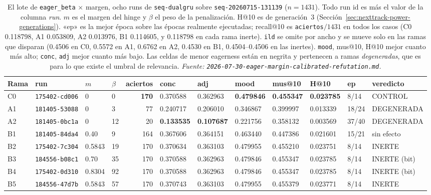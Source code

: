\documentclass[11pt]{article}
\newcommand{\runid}[1]{\texttt{\small\seqsplit{#1}}}
\newcommand{\dsid}[1]{\texttt{\small #1}}
\newcommand{\best}[1]{\textbf{#1}}
\begin{document}
\begin{table}[ht]
  \centering
  \caption{El lote de \texttt{eager\_beta} $\times$ margen, ocho runs de
  \texttt{seq-dualgru} sobre \dsid{seq-20260715-131139} ($n=\num{1431}$). Todo run
  id es \protect\runid{run-20260730-} más el valor de la columna \emph{run}. $m$ es
  el margen del hinge y $\beta$ el peso de la penalización. H@10 es de
  generación~3 (Sección~\ref{sec:nexttrack-power-generations}). «ep» es la mejor época sobre
  las épocas realmente ejecutadas; recall@10 es \texttt{aciertos}$/\num{1431}$ en
  todos los casos (C0 \num{0.118798}, A1 \num{0.053809}, A2 \num{0.013976}, B1
  \num{0.114605}, y \num{0.118798} en cada rama inerte). \texttt{ild} se omite por
  ancho y se mueve solo en las ramas que disparan (\num{0.4506} en C0,
  \num{0.5572} en A1, \num{0.6762} en A2, \num{0.4530} en B1,
  \numrange{0.4504}{0.4506} en las inertes). \texttt{mood}, mus@10, H@10 mejor
  cuanto más alto; \texttt{conc}, \texttt{adj} mejor cuanto más bajo. Las celdas de
  menor eagerness están en negrita y pertenecen a ramas \emph{degeneradas}, que es
  para lo que existe el umbral de relevancia.
  \emph{Fuente: \texttt{2026-07-30-eager-margin-calibrated-refutation.md}.}}
  \label{tab:nexttrack-eagermargin}
  {\scriptsize\setlength{\tabcolsep}{2.5pt}\begin{tabular}{llllrlllllll}
    \toprule
    Rama & run & $m$ & $\beta$ & aciertos & conc & adj & mood & mus@10 & H@10 & ep & veredicto \\
    \midrule
    C0 & \texttt{175402-cd006} & 0 & 0 & \best{170} & 0.370588 & 0.362963 & \best{0.479846} & \best{0.455347} & \best{0.023785} & 8/14 & CONTROL \\
    A1 & \texttt{181405-53088} & 0 & 3 & 77 & 0.240717 & 0.206010 & 0.346867 & 0.399997 & 0.013339 & 18/24 & DEGENERADA \\
    A2 & \texttt{181405-0bc1a} & 0 & 12 & 20 & \best{0.133535} & \best{0.107687} & 0.221756 & 0.358132 & 0.003569 & 37/40 & DEGENERADA \\
    B1 & \texttt{181405-84da4} & 0.40 & 9 & 164 & 0.367606 & 0.364151 & 0.463440 & 0.447386 & 0.021601 & 15/21 & sin efecto \\
    B2 & \texttt{175402-7c304} & 0.5843 & 19 & 170 & 0.370634 & 0.363103 & 0.479955 & 0.455210 & 0.023751 & 8/14 & INERTE \\
    B3 & \texttt{184556-b08c1} & 0.70 & 35 & 170 & 0.370588 & 0.362963 & 0.479846 & 0.455347 & 0.023785 & 8/14 & INERTE (bit) \\
    B4 & \texttt{175402-0d310} & 0.8304 & 92 & 170 & 0.370588 & 0.362963 & 0.479846 & 0.455347 & 0.023785 & 8/14 & INERTE (bit) \\
    B5 & \texttt{184556-47d7b} & 0.5843 & 57 & 170 & 0.370743 & 0.363103 & 0.479955 & 0.455379 & 0.023771 & 8/14 & INERTE \\
    \bottomrule
  \end{tabular}}
\end{table}
\end{document}
